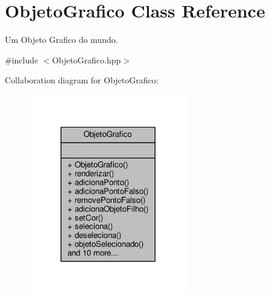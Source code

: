 \hypertarget{classObjetoGrafico}{\section{Objeto\+Grafico Class Reference}
\label{classObjetoGrafico}
}


Um Objeto Grafico do mundo.  




{\ttfamily \#include $<$Objeto\+Grafico.\+hpp$>$}



Collaboration diagram for Objeto\+Grafico\+:
\nopagebreak
\begin{figure}[H]
\begin{center}
\leavevmode
\includegraphics[width=197pt]{classObjetoGrafico__coll__graph}
\end{center}
\end{figure}

